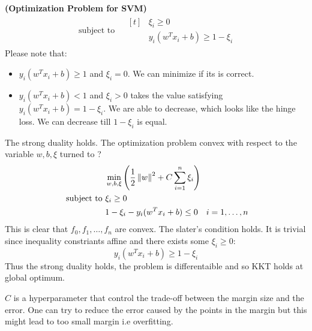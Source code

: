 \begin{definition}{\textbf{(Optimization Problem for SVM)}}
\begin{equation*}
\begin{aligned}
        \text{ subject to }& \begin{aligned}[t]
            &\xi_i\ge0 \\
            &y_i(w^Tx_i + b)\ge1-\xi_i
        \end{aligned}
    \end{aligned}
    \end{equation*}
    Please note that:
    \begin{itemize}
        \item $y_i(w^Tx_i + b)\ge1$ and $\xi_i=0$. We can minimize if its is correct.
        \item $y_i(w^Tx_i + b)<1$ and $\xi_i>0$ takes the value satisfying $y_i(w^Tx_i+b) = 1-\xi_i$. We are able to decrease, which looks like the hinge loss. We can decrease till $1-\xi_i$ is equal. 
    \end{itemize}
\end{definition}

\begin{remark}
    The strong duality holds. The optimization problem convex with respect to the variable $w, b, \xi$ turned to ? 
    \begin{equation*}
    \begin{aligned}
        &\min_{w, b, \xi}\left( \frac{1}{2}\left\lVert w\right\rVert^2 + C\sum^n_{i=1}\xi_i \right) \\
        \text{ subject to }&\begin{aligned}[t]
            &\xi_i\ge0 \\
            &1-\xi_i-y_i(w^Tx_i + b)\le 0 \quad i=1,\dots,n
        \end{aligned}
    \end{aligned}
    \end{equation*}
    This is clear that $f_0, f_1,\dots,f_n$ are convex. The slater's condition holds. It is trivial since inequality constriants affine and there exists some $\xi_i\ge0$:
    \begin{equation*}
        y_i(w^Tx_i+b)\ge1-\xi_i
    \end{equation*}
    Thus the strong duality holds, the problem is differentaible and so KKT holds at global optimum.
\end{remark}

\begin{remark}
    $C$ is a hyperparameter that control the trade-off between the margin size and the error. One can try to reduce the error caused by the points in the margin but this might lead to too small margin i.e overfitting.
\end{remark}

